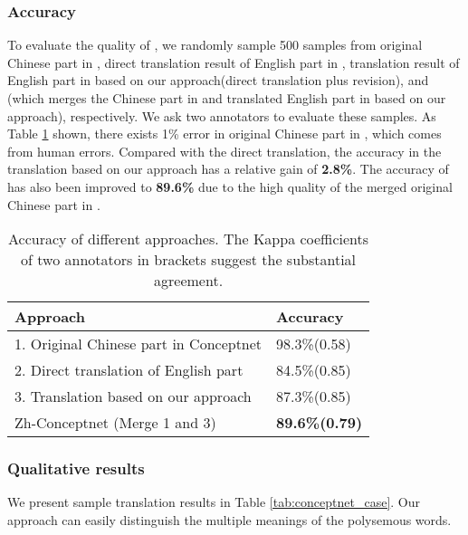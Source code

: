 \subsubsection*{Accuracy}
To evaluate the quality of \zhcon, 
we randomly sample 500 samples from original Chinese part in \con, 
direct translation result of English part in \con, translation result of English part in \con based on our approach(direct translation plus revision), and \zhcon(which merges the Chinese part in \con and translated English part in \con based on our approach), respectively.
We ask two annotators to evaluate these samples. 
As Table \ref{tab:conceptnet_accuracy} shown, there exists 1\% error in original Chinese part in \con, which comes from human errors.
Compared with the direct translation, the accuracy in the translation based on our approach has a relative gain of \textbf{2.8\%}.
The accuracy of \zhcon has also been improved to \textbf{89.6\%} due to the high quality of the merged original Chinese part in \con.

\begin{table}[ht]
\small
\centering
\begin{tabular}{|l|l|}
	\hline
	Approach & Accuracy \\ \hline\hline
	1. Original Chinese part in Conceptnet& 98.3\%(0.58) \\\hline
	2. Direct translation of English part                 & 84.5\%(0.85) \\\hline
	3. Translation based on our approach & 87.3\%(0.85) \\\hline
	Zh-Conceptnet (Merge 1 and 3) & \textbf{89.6\%(0.79)} \\\hline
\end{tabular}
\caption{Accuracy of different approaches. The Kappa coefficients \cite{landis1977measurement} of two annotators in brackets suggest the substantial agreement.}
\label{tab:conceptnet_accuracy}

\end{table}
\subsubsection*{Qualitative results}
We present sample translation results in Table \ref{tab:conceptnet_case}. 
Our approach can easily distinguish the multiple meanings of the polysemous words.


